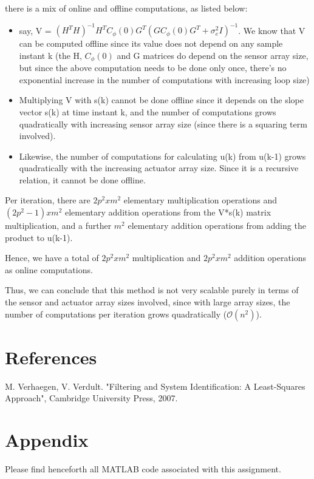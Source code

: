 \documentclass[12pt]{report}
\begin{document}
there is a mix of online and offline computations, as listed below:

\begin{itemize}
	\item say, V = $ (H^{T}H)^{-1}H^{T}C_{\phi}(0)G^{T}(GC_{\phi}(0)G^{T} + \sigma_{e}^{2}I)^{-1}$. We know that V can be computed offline since its value does not depend on any sample instant k (the H, $C_{\phi}(0)$ and G matrices do depend on the sensor array size, but since the above computation needs to be done only once, there's no exponential increase in the number of computations with increasing loop size)
	\item Multiplying V with s(k) cannot be done offline since it depends on the slope vector s(k) at time instant k, and the number of computations grows quadratically with increasing sensor array size (since there is a squaring term involved).
	\item Likewise, the number of computations for calculating u(k) from u(k-1) grows quadratically with the increasing actuator array size. Since it is a recursive relation, it cannot be done offline.
\end{itemize}

Per iteration, there are $2p^{2}x m^2$ elementary multiplication operations and $(2p^{2} - 1)x m^2$ elementary addition operations from the V*s(k) matrix multiplication, and a further $m^2$ elementary addition operations from adding the product to u(k-1).

Hence, we have a total of $2p^{2}x m^2$ multiplication and $2p^{2}x m^2$ addition operations as online computations.

Thus, we can conclude that this method is not very scalable purely in terms of the sensor and actuator array sizes involved, since with large array sizes, the number of computations per iteration grows quadratically ($\mathcal{O}(n^2)$).

\newpage
\section*{References}


M. Verhaegen, V. Verdult. "Filtering and System Identification: A Least-Squares Approach", Cambridge University Press, 2007.

\section*{Appendix}

Please find henceforth all MATLAB code associated with this assignment.
\end{document}
